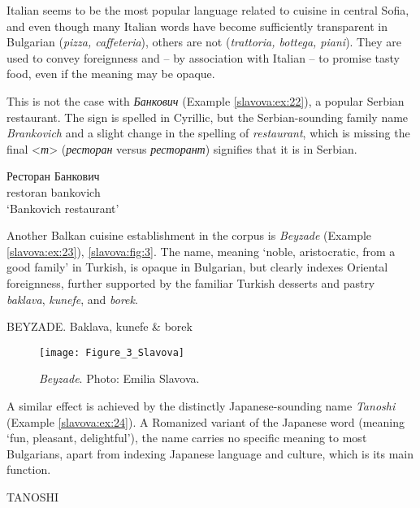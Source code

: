 \documentclass[output=paper]{langscibook}
\begin{document}
Italian seems to be the most popular language related to cuisine in central Sofia, and even though many Italian words have become sufficiently transparent in Bulgarian (\textit{pizza, caffeteria}), others are not (\textit{trattoria, bottega, piani}). They are used to convey foreignness and – by association with Italian – to promise tasty food, even if the meaning may be opaque. 

This is not the case with \textit{Банкович} (Example \ref{slavova:ex:22}), a popular Serbian restaurant. The sign is spelled in Cyrillic, but the Serbian-sounding family name \textit{Brankovich} and a slight change in the spelling of \textit{restaurant}, which is missing the final <\textit{т}> (\textit{ресторан} versus \textit{ресторант}) signifies that it is in Serbian.

\begin{exe}
  \ex\label{slavova:ex:22}
  \gll Ресторан Банкович \\
  restoran bankovich \\
  \glt ‘Bankovich restaurant’
\end{exe}


Another Balkan cuisine establishment in the corpus is \textit{Beyzade} (Example \ref{slavova:ex:23}), \autoref{slavova:fig:3}. The name, meaning ‘noble, aristocratic, from a good family’ in Turkish, is opaque in Bulgarian, but clearly indexes Oriental foreignness, further supported by the familiar Turkish desserts and pastry \textit{baklava}, \textit{kunefe}, and \textit{borek}.

\begin{exe}
  \ex\label{slavova:ex:23} BEYZADE. Baklava, kunefe \& borek 
\end{exe}

\begin{figure} %
  \texttt{[image: Figure\_3\_Slavova]}
  \caption{\textit{Beyzade}. Photo: Emilia Slavova.}
  \label{slavova:fig:3}
\end{figure}

A similar effect is achieved by the distinctly Japanese-sounding name \textit{Tanoshi} (Example \ref{slavova:ex:24}). A Romanized variant of the Japanese word (meaning ‘fun, pleasant, delightful’), the name carries no specific meaning to most Bulgarians, apart from indexing Japanese language and culture, which is its main function.

\begin{exe}
  \ex\label{slavova:ex:24} TANOSHI
\end{exe}
\clearpage
\end{document}
